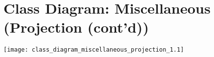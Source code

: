 \section{Class Diagram: Miscellaneous (Projection (cont'd))}
\texttt{[image: class\_diagram\_miscellaneous\_projection\_1.1]} 